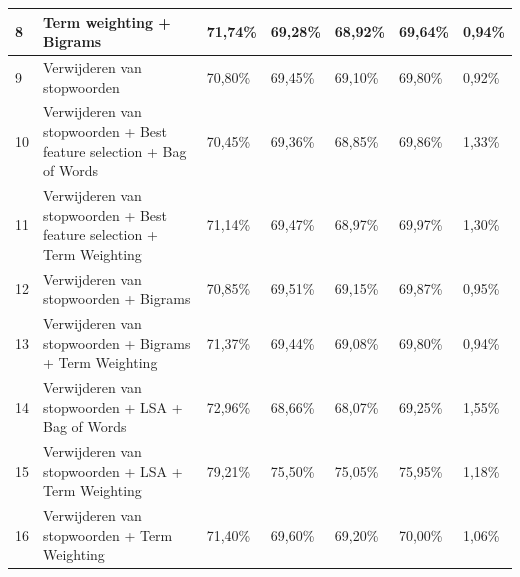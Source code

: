 \begin{table}
\begin{adjustbox}{width=1\textwidth}
\begin{tabular}{|l|l|l|l|l|l|l|}
8        & Term weighting  + Bigrams                                                        & 71,74\%                     & 69,28\%                & 68,92\%                 & 69,64\%                  & 0,94\%      \\ \hline
9        & Verwijderen van stopwoorden                                                      & 70,80\%                     & 69,45\%                & 69,10\%                 & 69,80\%                  & 0,92\%      \\ \hline
10       & Verwijderen van stopwoorden + Best feature selection + Bag of Words   & 70,45\%                     & 69,36\%                & 68,85\%                 & 69,86\%                  & 1,33\%      \\ \hline
11       & Verwijderen van stopwoorden + Best feature selection + Term Weighting & 71,14\%                     & 69,47\%                & 68,97\%                 & 69,97\%                  & 1,30\%      \\ \hline
12       & Verwijderen van stopwoorden + Bigrams                                            & 70,85\%                     & 69,51\%                & 69,15\%                 & 69,87\%                  & 0,95\%      \\ \hline
13       & Verwijderen van stopwoorden + Bigrams + Term Weighting                           & 71,37\%                     & 69,44\%                & 69,08\%                 & 69,80\%                  & 0,94\%      \\ \hline
14       & Verwijderen van stopwoorden + LSA + Bag of Words                                 & 72,96\%                     & 68,66\%                & 68,07\%                 & 69,25\%                  & 1,55\%      \\ \hline
15       & Verwijderen van stopwoorden + LSA + Term Weighting                               & 79,21\%                     & 75,50\%                & 75,05\%                 & 75,95\%                  & 1,18\%      \\ \hline
16       & Verwijderen van stopwoorden + Term Weighting                                     & 71,40\%                     & 69,60\%                & 69,20\%                 & 70,00\%                  & 1,06\%      \\ \hline
\end{tabular}
\end{adjustbox}
\end{table}



